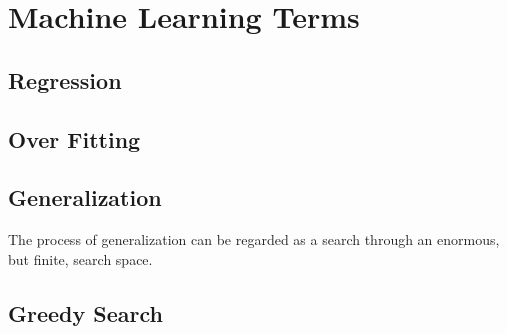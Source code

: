 \chapter{Machine Learning Terms}

\section{Regression}
\section{Over Fitting}
\section{Generalization}
The process of generalization can be regarded as a search through an enormous, but
finite, search space.
\section{Greedy Search}

